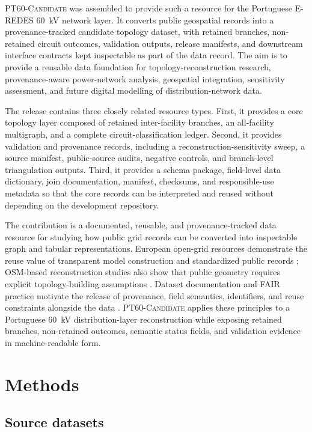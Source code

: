 \documentclass[10pt]{article}
\newcommand{\dataset}{\textsc{PT60-Candidate}\xspace}
\begin{document}
\dataset was assembled to provide such a resource for the Portuguese E-REDES 60~kV network layer. It converts public geospatial records into a provenance-tracked candidate topology dataset, with retained branches, non-retained circuit outcomes, validation outputs, release manifests, and downstream interface contracts kept inspectable as part of the data record. The aim is to provide a reusable data foundation for topology-reconstruction research, provenance-aware power-network analysis, geospatial integration, sensitivity assessment, and future digital modelling of distribution-network data.

The release contains three closely related resource types. First, it provides a core topology layer composed of retained inter-facility branches, an all-facility multigraph, and a complete circuit-classification ledger. Second, it provides validation and provenance records, including a reconstruction-sensitivity sweep, a source manifest, public-source audits, negative controls, and branch-level triangulation outputs. Third, it provides a schema package, field-level data dictionary, join documentation, manifest, checksums, and responsible-use metadata so that the core records can be interpreted and reused without depending on the development repository.

The contribution is a documented, reusable, and provenance-tracked data resource for studying how public grid records can be converted into inspectable graph and tabular representations. European open-grid resources demonstrate the reuse value of transparent model construction and standardized public records \cite{Medjroubi2017,Horsch2018,Wiese2019,Xiong2025}; OSM-based reconstruction studies also show that public geometry requires explicit topology-building assumptions \cite{Rivera2019,Haklay2008}. Dataset documentation and FAIR practice motivate the release of provenance, field semantics, identifiers, and reuse constraints alongside the data \cite{Wilkinson2016,Gebru2021}. \dataset applies these principles to a Portuguese 60~kV distribution-layer reconstruction while exposing retained branches, non-retained outcomes, semantic status fields, and validation evidence in machine-readable form.

\section{Methods}

\subsection{Source datasets}
\end{document}
